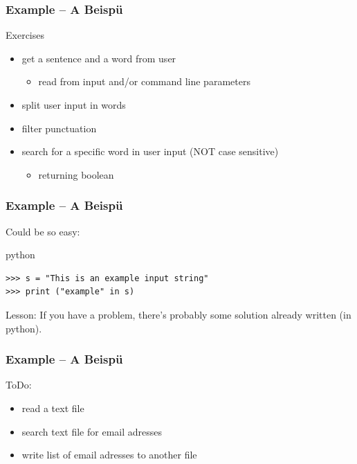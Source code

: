 \documentclass{beamer}
\begin{document}
\begin{frame}[fragile]
	\frametitle{Example -- A Beispü}
	
	\begin{block}{Exercises}
	\begin{itemize}
	\item[\checkmark] get a sentence and a word from user
		\begin{itemize}
		\item[\checkmark] read from input and/or command line parameters
		\end{itemize}
	\item[\checkmark] split user input in words
	\item[\checkmark] filter punctuation
	\item[\checkmark] search for a specific word in user input (NOT case sensitive)
		\begin{itemize}
		\item[\checkmark] returning boolean
		\end{itemize}
	\end{itemize}
	\end{block}
\end{frame}

\begin{frame}[fragile]
	\frametitle{Example -- A Beispü}
	
	Could be so easy:
\pause
	\begin{exampleblock}{python}
	\begin{lstlisting}
>>> s = "This is an example input string"
>>> print ("example" in s)
	\end{lstlisting}
	\end{exampleblock}
\pause
	\begin{block}{Lesson:}
	If you have a problem, there's probably some solution already written (in python).
	\end{block}
\end{frame}


\begin{frame}[fragile]
	\frametitle{Example -- A Beispü}
	
	ToDo:
	\begin{itemize}
	\item[\checkmark] read a text file
	\item[\checkmark] search text file for email adresses
	\item[\checkmark] write list of email adresses to another file
	\end{itemize}
\end{frame}
\end{document}
